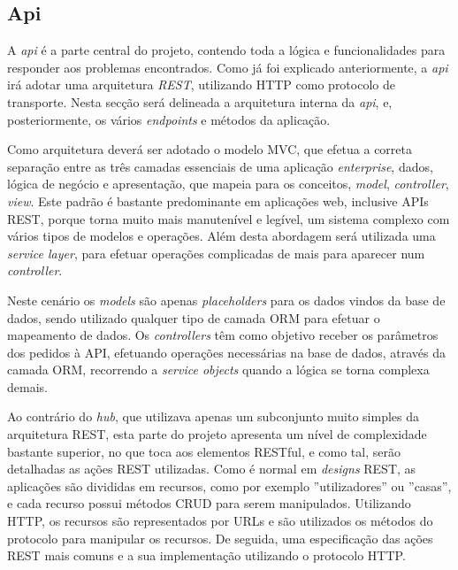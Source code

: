 \subsection{Api}

A \textit{api} é a parte central do projeto, contendo toda a lógica e funcionalidades para responder aos problemas encontrados. Como já foi explicado anteriormente, a \textit{api} irá adotar uma arquitetura \textit{REST}, utilizando HTTP como protocolo de transporte. Nesta secção será delineada a arquitetura interna da \textit{api}, e, posteriormente, os vários \textit{endpoints} e métodos da aplicação.

Como arquitetura deverá ser adotado o modelo MVC, que efetua a correta separação entre as três camadas essenciais de uma aplicação \textit{enterprise}, dados, lógica de negócio e apresentação, que mapeia para os conceitos, \textit{model}, \textit{controller}, \textit{view}. Este padrão é bastante predominante em aplicações web, inclusive APIs REST, porque torna muito mais manutenível e legível, um sistema complexo com vários tipos de modelos e operações. Além desta abordagem será utilizada uma \textit{service layer}, para efetuar operações complicadas de mais para aparecer num \textit{controller}.

Neste cenário os \textit{models} são apenas \textit{placeholders} para os dados vindos da base de dados, sendo utilizado qualquer tipo de camada ORM para efetuar o mapeamento de dados. Os \textit{controllers} têm como objetivo receber os parâmetros dos pedidos à API, efetuando operações necessárias na base de dados, através da camada ORM, recorrendo a \textit{service objects} quando a lógica se torna complexa demais.

Ao contrário do \textit{hub}, que utilizava apenas um subconjunto muito simples da arquitetura REST, esta parte do projeto apresenta um nível de complexidade bastante superior, no que toca aos elementos RESTful, e como tal, serão detalhadas as ações REST utilizadas.
Como é normal em \textit{designs} REST, as aplicações são divididas em recursos, como por exemplo ''utilizadores'' ou ''casas'', e cada recurso possui métodos CRUD para serem manipulados. Utilizando HTTP, os recursos são representados por URLs e são utilizados os métodos do protocolo para manipular os recursos. De seguida, uma especificação das ações REST mais comuns e a sua implementação utilizando o protocolo HTTP.

